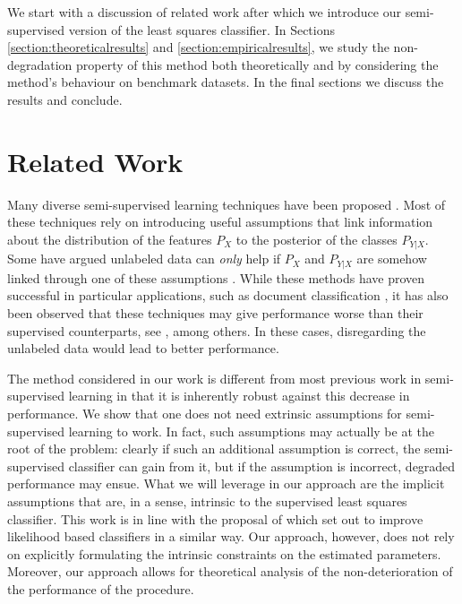 \documentclass{llncs}
\begin{document}
We start with a discussion of related work after which we introduce our semi-supervised version of the least squares classifier. In Sections \ref{section:theoreticalresults} and \ref{section:empiricalresults}, we study the non-degradation property of this method both theoretically and by considering the method's behaviour on benchmark datasets. In the final sections we discuss the results and conclude.

\section{Related Work} 
\label{section:relatedwork}
Many diverse semi-supervised learning techniques have been proposed \cite{Chapelle2006,Zhu2009}. Most of these techniques rely on introducing useful assumptions that link information about the distribution of the features $P_X$ to the posterior of the classes $P_{Y|X}$. Some have argued unlabeled data can \emph{only} help if $P_X$ and $P_{Y|X}$ are somehow linked  through one of these assumptions \cite{Singh2008}.
While these methods have proven successful in particular applications, such as document classification \cite{Nigam2000}, it has also been observed that these techniques may give performance worse than their supervised counterparts, see \cite{Cozman2006,Cozman2003}, among others. 
In these cases, disregarding the unlabeled data would lead to better performance. 

The method considered in our work is different from most previous work in semi-supervised learning in that it is inherently robust against this decrease in performance. We show that one does not need extrinsic assumptions for semi-supervised learning to work. In fact, such assumptions may actually be at the root of the problem: clearly if such an additional assumption is correct, the semi-supervised classifier can gain from it, but if the assumption is incorrect, degraded performance may ensue.  What we will leverage in our approach are the implicit assumptions that are, in a sense, intrinsic to the supervised least squares classifier. This work is in line with the proposal of \cite{Loog2014a,Loog2014b} which set out to improve likelihood based classifiers in a similar way. Our approach, however, does not rely on explicitly formulating the intrinsic constraints on the estimated parameters. Moreover, our approach allows for theoretical analysis of the non-deterioration of the performance of the procedure.
\end{document}
